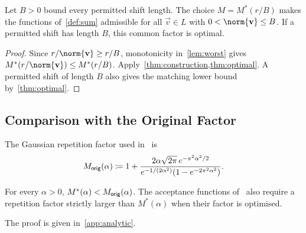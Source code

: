 \begin{corollary}
\label{cor:bound}
Let $B>0$ bound every permitted shift length. The choice $M=M^*(r/B)$ makes the functions of~\cref{def:sum} admissible for all $\vec v\in L$ with $0<\norm{\vec v}\le B$. If a permitted shift has length $B$, this common factor is optimal.
\end{corollary}
\begin{proof}
Since $r/\norm{\vec v}\ge r/B$, monotonicity in~\cref{lem:worst} gives $M^*(r/\norm{\vec v})\le M^*(r/B)$. Apply~\cref{thm:construction,thm:optimal}. A permitted shift of length $B$ also gives the matching lower bound by~\cref{thm:optimal}.
\end{proof}

\subsection{Comparison with the Original Factor}

\begin{definition}
\label{def:original}
The Gaussian repetition factor used in~\cite{GartnerFull} is
\begin{equation}
\label{eq:original}
 M_{\mathsf{orig}}(\alpha)\coloneqq1+\frac{2\alpha\sqrt{2\pi}\,e^{-\pi^2\alpha^2/2}}{e^{-1/(2\alpha^2)}(1-e^{-2\pi^2\alpha^2})}.
\end{equation}
\end{definition}

\begin{proposition}
\label{prop:improvement}
For every $\alpha>0$, $M^*(\alpha)<M_{\mathsf{orig}}(\alpha)$. The acceptance functions of~\cite[Theorem~1]{GartnerFull} also require a repetition factor strictly larger than $M^*(\alpha)$ when their factor is optimised.
\end{proposition}
The proof is given in~\cref{app:analytic}.
